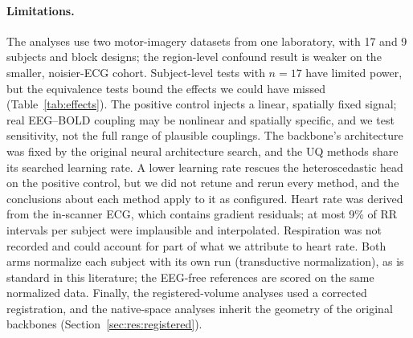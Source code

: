 \paragraph{Limitations.} The analyses use two motor-imagery datasets from one laboratory, with 17 and 9 subjects and block designs; the region-level confound result is weaker on the smaller, noisier-ECG cohort. Subject-level tests with $n=17$ have limited power, but the equivalence tests bound the effects we could have missed (Table~\ref{tab:effects}). The positive control injects a linear, spatially fixed signal; real EEG--BOLD coupling may be nonlinear and spatially specific, and we test sensitivity, not the full range of plausible couplings. The backbone's architecture was fixed by the original neural architecture search, and the UQ methods share its searched learning rate. A lower learning rate rescues the heteroscedastic head on the positive control, but we did not retune and rerun every method, and the conclusions about each method apply to it as configured. Heart rate was derived from the in-scanner ECG, which contains gradient residuals; at most 9\% of RR intervals per subject were implausible and interpolated. Respiration was not recorded and could account for part of what we attribute to heart rate. Both arms normalize each subject with its own run (transductive normalization), as is standard in this literature; the EEG-free references are scored on the same normalized data. Finally, the registered-volume analyses used a corrected registration, and the native-space analyses inherit the geometry of the original backbones (Section~\ref{sec:res:registered}).

